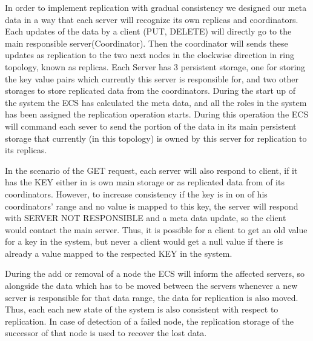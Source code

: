 \documentclass{sig-alternate}
\begin{document}
In order to implement replication with gradual consistency we designed our meta data in a way that each server will recognize its own replicas and coordinators. Each updates of the data by a client (PUT, DELETE) will directly go to the main responsible server(Coordinator). Then the coordinator will sends these updates as replication to the two next nodes in the clockwise direction in ring topology, known as replicas. Each Server has 3 persistent storage, one for storing the key value pairs which currently this server is responsible for, and two other storages to store replicated data from the coordinators. During the start up of the system the ECS has calculated the meta data, and all the roles in the system has been assigned the replication operation starts. During this operation the ECS will command each sever to send the portion of the data in its main persistent storage that currently (in this topology) is owned by this server for replication to its replicas.  

In the scenario of the GET request, each server will also respond to client, if it has the KEY either in is own main storage or as replicated data from of its coordinators. However, to increase consistency if the key is in on of his coordinators' range and no value is mapped to this key, the server will respond with SERVER NOT RESPONSIBLE and a meta data update, so the client would contact the main server. Thus, it is possible for a client to get an old value for a key in the system, but never a client would get a null value if there is already a value mapped to the respected KEY in the system.

During the add or removal of a node the ECS will inform the affected servers, so alongside the data which has to be moved between the servers whenever a new server is responsible for that data range, the data for replication is also moved. Thus, each each new state of the system is also consistent with respect to replication. In case of detection of a failed node, the replication storage of the successor of that node is used to recover the lost data. 
\end{document}
